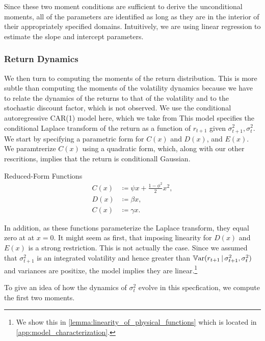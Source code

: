 \documentclass[11pt, letterpaper, twoside, final]{article}
\begin{document}
Since these two moment conditions are sufficient to derive the unconditional moments, all of the parameters are
identified as long as they are in the interior of their appropriately specified domains.
Intuitively, we are using linear regression to estimate the slope and intercept parameters.


\subsubsection{Return Dynamics}

We then turn to computing the moments of the return distribution. 
This is more subtle than computing the moments of the volatility dynamics because we have to relate the dynamics
of the returns to that of the volatility and to the stochastic discount factor, which is not observed. 
We use the conditional autoregressive CAR(1) model here, which we take from
\textcite{darolles2006structural,khrapov2016affine}
This model  specifies the conditional Laplace transform of the return as a function of $r_{t+1}$ given
$\sigma^2_{t+1}, \sigma^2_t$.
We start by specifying a parametric form for $C(x)$ and $D(x)$, and $E(x)$.
We paramtrerize $C(x)$ using a quadratic form, which, along with our other rescritions, implies that the return is
conditionall Gaussian.

\begin{defn}{Reduced-Form Functions}
    \label{defn:physical_return_dynamics}
    \begin{align}
        C(x) &\coloneqq \psi x + \frac{1 - \phi^2}{2} x^2, \\
        D(x) &\coloneqq \beta x,  \\
        C(x) &\coloneqq \gamma x. 
    \end{align}
\end{defn}

In addition, as these functions parameterize the Laplace transform, they equal zero at at $x=0$.
It might seem as first, that imposing linearity for $D(x)$ and $E(x)$ is a strong restriction.
This is not actually the case.
Since we assumed that $\sigma^2_{t+1}$ is an integrated volatility and hence greater than $\operatorname{\mathbb{V}ar}(r_{t+1}
\,\vert\, \sigma^2_{t+1}, \sigma^2_{t})$ and variances are positixe, the model implies they are linear.\footnote{We
show this in \cref{lemma:linearity_of_physical_functions} which is located in \cref{app:model_characterization}.}


To give an idea of how the dynamics of $\sigma^2_t$ evolve in this specfication, we compute the first two moments.
\end{document}
